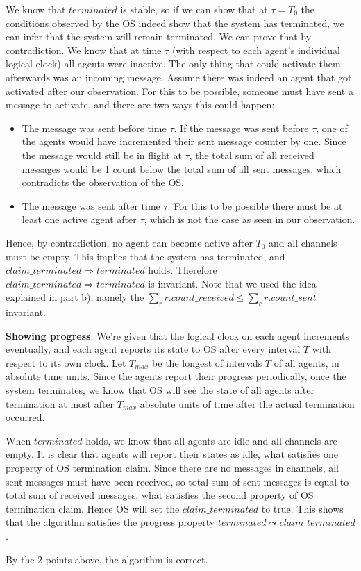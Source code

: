 \documentclass[10pt,letter]{article}
\begin{document}
We know that $terminated$ is stable, so if we can show that at $\tau = T_0$ the conditions observed by the OS indeed show that the system has terminated, we can infer that the system will remain terminated. We can prove that by contradiction. We know that at time $\tau$ (with respect to each agent's individual logical clock) all agents were inactive. The only thing that could activate them afterwards was an incoming message. Assume there was indeed an agent that got activated after our observation. For this to be possible, someone must have sent a message to activate, and there are two ways this could happen:

\begin{itemize}
\item The message was sent before time $\tau$. If the message was sent before $\tau$, one of the agents would have incremented their sent message counter by one. Since the message would still be in flight at $\tau$, the total sum of all received messages would be 1 count below the total sum of all sent messages, which contradicts the observation of the OS.
\item The message was sent after time $\tau$. For this to be possible there must be at least one active agent after $\tau$, which is not the case as seen in our observation.
\end{itemize}

Hence, by contradiction, no agent can become active after $T_0$ and all channels must be empty. This implies that the system has terminated, and $claim\_terminated \Rightarrow terminated$ holds. Therefore $claim\_terminated \Rightarrow terminated$ is invariant. Note that we used the idea explained in part b), namely the $\sum\limits_{r} r.count\_received \leq \sum\limits_{r} r.count\_sent$ invariant.

\textbf{Showing progress}: We're given that the logical clock on each agent increments eventually, and each agent reports its state to OS after every interval $T$ with respect to its own clock. Let $T_{max}$ be the longest of intervals $T$ of all agents, in absolute time units. Since the agents report their progress periodically, once the system terminates, we know that OS will see the state of all agents after termination at most after $T_{max}$ absolute units of time after the actual termination occurred.

When $terminated$ holds, we know that all agents are idle and all channels are empty. It is clear that agents will report their states as idle, what satisfies one property of OS termination claim. Since there are no messages in channels, all sent messages must have been received, so total sum of sent messages is equal to total sum of received messages, what satisfies the second property of OS termination claim. Hence OS will set the $claim\_terminated$ to true. This shows that the algorithm satisfies the progress property $terminated \leadsto claim\_terminated$.

By the 2 points above, the algorithm is correct.
\end{document}
